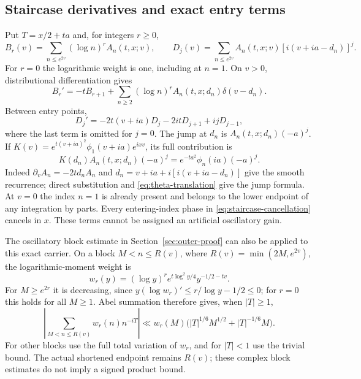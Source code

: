 \documentclass[11pt]{article}
\numberwithin{equation}{section}
\theoremstyle{definition}
\theoremstyle{remark}
\begin{document}
\subsection{Staircase derivatives and exact entry terms}
Put $T=x/2+ta$ and, for integers $r\ge0$,
\[
 B_r(v)=\sum_{n\le e^{2v}}(\log n)^r A_n(t,x;v),
 \qquad
 D_j(v)=\sum_{n\le e^{2v}}A_n(t,x;v)[i(v+ia-d_n)]^j.
\]
For $r=0$ the logarithmic weight is one, including at $n=1$.
On $v>0$, distributional differentiation gives
\begin{equation}
 B_r'=-tB_{r+1}+
 \sum_{n\ge2}(\log n)^r A_n(t,x;d_n)\delta(v-d_n).
 \label{eq:staircase-recurrence}
\end{equation}
Between entry points,
\begin{equation}
 D_j'=-2t(v+ia)D_j-2itD_{j+1}+ijD_{j-1},
 \label{eq:staircase-jet-recurrence}
\end{equation}
where the last term is omitted for $j=0$. The jump at $d_n$ is
$A_n(t,x;d_n)(-a)^j$. If
$K(v)=e^{t(v+ia)^2}\phi_1(v+ia)e^{ixv}$, its full contribution is
\begin{equation}
 K(d_n)A_n(t,x;d_n)(-a)^j
   =e^{-ta^2}\phi_n(ia)(-a)^j.
 \label{eq:staircase-cancellation}
\end{equation}
Indeed $\partial_v A_n=-2td_nA_n$ and
$d_n=v+ia+i[i(v+ia-d_n)]$ give the smooth recurrence; direct
substitution and \eqref{eq:theta-translation} give the jump formula.
At $v=0$ the index $n=1$ is already present and belongs to the lower
endpoint of any integration by parts. Every entering-index phase in
\eqref{eq:staircase-cancellation} cancels in $x$. These terms cannot
be assigned an artificial oscillatory gain.

The oscillatory block estimate in Section~\ref{sec:outer-proof} can also
be applied to this exact carrier. On a block $M<n\le R(v)$, where
$R(v)=\min(2M,e^{2v})$, the logarithmic-moment weight is
\[
 w_r(y)=(\log y)^r e^{t\log^2y/4}y^{-1/2-tv}.
\]
For $M\ge e^{2r}$ it is decreasing, since
$y(\log w_r)'\le r/\log y-1/2\le0$; for $r=0$ this holds for
all $M\ge1$. Abel summation therefore gives, when $|T|\ge1$,
\[
 \left|\sum_{M<n\le R(v)}w_r(n)n^{-iT}\right|
 \ll w_r(M)\bigl(|T|^{1/6}M^{1/2}+|T|^{-1/6}M\bigr).
\]
For other blocks use the full total variation of $w_r$, and for
$|T|<1$ use the trivial bound. The actual shortened endpoint remains
$R(v)$; these complex block estimates do not imply a signed product
bound.
\end{document}

